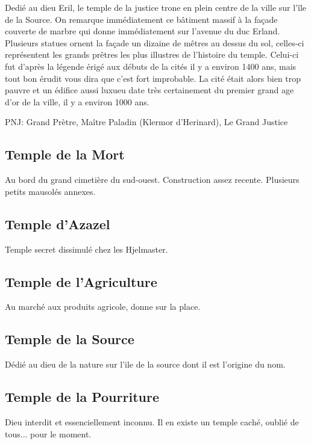Dedié au dieu Eril, le temple de la justice trone en plein centre de la ville sur l'île de la Source.
On remarque immédiatement ce bâtiment massif à la façade couverte de marbre qui donne immédiatement
sur l'avenue du duc Erland. Plusieurs statues ornent la façade un dizaine de mêtres au dessus du sol,
celles-ci représentent les grands prêtres les plus illustres de l'histoire du temple. Celui-ci fut 
d'après la légende érigé aux débuts de la cités il y a environ 1400 ans, mais tout bon érudit vous
dira que c'est fort improbable. La cité était alors bien trop pauvre et un édifice aussi luxueu date très 
certainement du premier grand age d'or de la ville, il y a environ 1000 ans.

PNJ: Grand Prètre, Maître Paladin (Klermor d'Herinard), Le Grand Justice

\subsection{Temple de la Mort}

Au bord du grand cimetière du sud-ouest. Construction assez recente. Plusieurs petits mausolés annexes.

\subsection{Temple d'Azazel}

Temple secret dissimulé chez les Hjelmaster.

\subsection{Temple de l'Agriculture}

Au marché aux produits agricole, donne sur la place.

\subsection{Temple de la Source}

Dédié au dieu de la nature sur l'ile de la source dont il est l'origine du nom.

\subsection{Temple de la Pourriture}

Dieu interdit et essenciellement inconnu. Il en existe un temple caché, oublié de tous... pour le moment.

